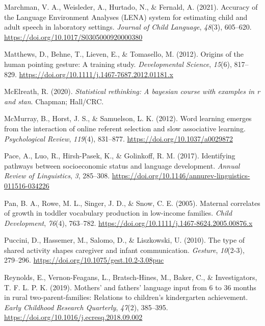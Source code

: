 \documentclass[
  english,
  man,mask]{apa6}
\begin{document}
\leavevmode\hypertarget{ref-marchman_accuracy_2021}{}%
Marchman, V. A., Weisleder, A., Hurtado, N., \& Fernald, A. (2021). Accuracy of the Language Environment Analyses (LENA) system for estimating child and adult speech in laboratory settings. \emph{Journal of Child Language}, \emph{48}(3), 605--620. \url{https://doi.org/10.1017/S0305000920000380}

\leavevmode\hypertarget{ref-matthews_origins_2012}{}%
Matthews, D., Behne, T., Lieven, E., \& Tomasello, M. (2012). Origins of the human pointing gesture: A training study. \emph{Developmental Science}, \emph{15}(6), 817--829. \url{https://doi.org/10.1111/j.1467-7687.2012.01181.x}

\leavevmode\hypertarget{ref-mcelreath_statistical_2020}{}%
McElreath, R. (2020). \emph{Statistical rethinking: A bayesian course with examples in r and stan}. Chapman; Hall/CRC.

\leavevmode\hypertarget{ref-mcmurray_word_2012}{}%
McMurray, B., Horst, J. S., \& Samuelson, L. K. (2012). Word learning emerges from the interaction of online referent selection and slow associative learning. \emph{Psychological Review}, \emph{119}(4), 831--877. \url{https://doi.org/10.1037/a0029872}

\leavevmode\hypertarget{ref-pace_identifying_2017}{}%
Pace, A., Luo, R., Hirsh-Pasek, K., \& Golinkoff, R. M. (2017). Identifying pathways between socioeconomic status and language development. \emph{Annual Review of Linguistics}, \emph{3}, 285--308. \url{https://doi.org/10.1146/annurev-linguistics-011516-034226}

\leavevmode\hypertarget{ref-pan_maternal_2005}{}%
Pan, B. A., Rowe, M. L., Singer, J. D., \& Snow, C. E. (2005). Maternal correlates of growth in toddler vocabulary production in low-income families. \emph{Child Development}, \emph{76}(4), 763--782. \url{https://doi.org/10.1111/j.1467-8624.2005.00876.x}

\leavevmode\hypertarget{ref-puccini_type_2010}{}%
Puccini, D., Hassemer, M., Salomo, D., \& Liszkowski, U. (2010). The type of shared activity shapes caregiver and infant communication. \emph{Gesture}, \emph{10}(2-3), 279--296. \url{https://doi.org/10.1075/gest.10.2-3.08puc}

\leavevmode\hypertarget{ref-reynolds_mothers_2019}{}%
Reynolds, E., Vernon-Feagans, L., Bratsch-Hines, M., Baker, C., \& Investigators, T. F. L. P. K. (2019). Mothers' and fathers' language input from 6 to 36 months in rural two-parent-families: Relations to children's kindergarten achievement. \emph{Early Childhood Research Quarterly}, \emph{47}(2), 385--395. \url{https://doi.org/10.1016/j.ecresq.2018.09.002}
\end{document}
